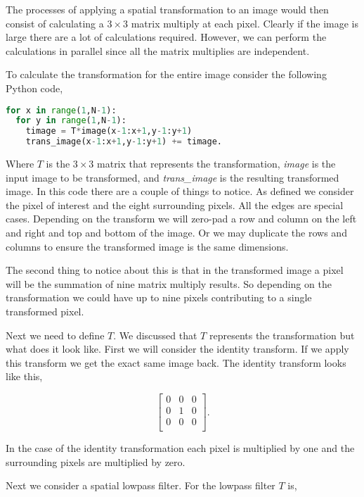 The processes of applying a spatial transformation to an image would then consist of calculating a $3 \times 3$ matrix multiply at each pixel. Clearly if the image is large there are a lot of calculations required. However, we can perform the calculations in parallel since all the matrix multiplies are independent.

To calculate the transformation for the entire image consider the following Python code,

\begin{lstlisting}[language=Python]
for x in range(1,N-1):
  for y in range(1,N-1):
	timage = T*image(x-1:x+1,y-1:y+1)
	trans_image(x-1:x+1,y-1:y+1) += timage.
\end{lstlisting}

Where $T$ is the $3\times 3$ matrix that represents the transformation, \emph{image} is the input image to be transformed, and \emph{trans\_image} is the resulting transformed image. In this code there are a couple of things to notice. As defined we consider the pixel of interest and the eight surrounding pixels. All the edges are special cases. Depending on the transform we will zero-pad a row and column on the left and right and top and bottom of the image. Or we may duplicate the rows and columns to ensure the transformed image is the same dimensions. 
 
The second thing to notice about this is that in the transformed image a pixel will be the summation of nine matrix multiply results. So depending on the transformation we could have up to nine pixels contributing to a single transformed pixel. 

Next we need to define $T$. We discussed that $T$ represents the transformation but what does it look like. First we will consider the identity transform. If we apply this transform we get the exact same image back. The identity transform looks like this,

\begin{equation}
\begin{bmatrix}
0 & 0 & 0\\
0 & 1 & 0\\
0 & 0 & 0\\
\end{bmatrix}.
\end{equation}
	
In the case of the identity transformation each pixel is multiplied by one and the surrounding pixels are multiplied by zero.

Next we consider a spatial lowpass filter. For the lowpass filter $T$ is,

